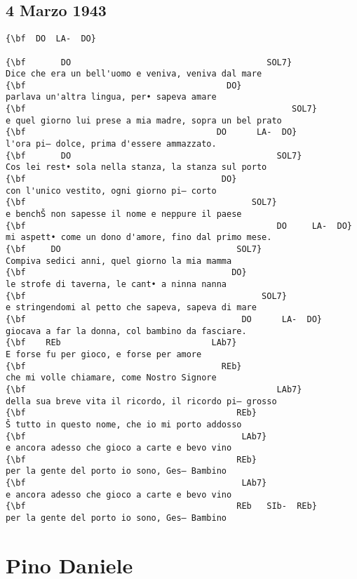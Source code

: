 \documentclass[a4paper]{article}
\begin{document}
\subsection{4 Marzo 1943}
\begin{Verbatim}[commandchars=\\\{\}]
{\bf  DO  LA-  DO}

{\bf       DO                                       SOL7}
Dice che era un bell'uomo e veniva, veniva dal mare
{\bf                                        DO}
parlava un'altra lingua, per• sapeva amare
{\bf                                                     SOL7}
e quel giorno lui prese a mia madre, sopra un bel prato
{\bf                                      DO      LA-  DO}
l'ora pi— dolce, prima d'essere ammazzato.
{\bf       DO                                         SOL7}
Cos lei rest• sola nella stanza, la stanza sul porto
{\bf                                       DO}
con l'unico vestito, ogni giorno pi— corto
{\bf                                             SOL7}
e benchŠ non sapesse il nome e neppure il paese
{\bf                                                  DO     LA-  DO}
mi aspett• come un dono d'amore, fino dal primo mese.
{\bf     DO                                   SOL7}
Compiva sedici anni, quel giorno la mia mamma
{\bf                                         DO}
le strofe di taverna, le cant• a ninna nanna
{\bf                                               SOL7}
e stringendomi al petto che sapeva, sapeva di mare
{\bf                                           DO      LA-  DO}
giocava a far la donna, col bambino da fasciare.
{\bf    REb                              LAb7}
E forse fu per gioco, e forse per amore
{\bf                                       REb}
che mi volle chiamare, come Nostro Signore
{\bf                                                  LAb7}
della sua breve vita il ricordo, il ricordo pi— grosso
{\bf                                          REb}
Š tutto in questo nome, che io mi porto addosso
{\bf                                           LAb7}
e ancora adesso che gioco a carte e bevo vino
{\bf                                          REb}
per la gente del porto io sono, Ges— Bambino
{\bf                                           LAb7}
e ancora adesso che gioco a carte e bevo vino
{\bf                                          REb   SIb-  REb}
per la gente del porto io sono, Ges— Bambino

\end{Verbatim}
\newpage
\section{Pino Daniele}
\end{document}
